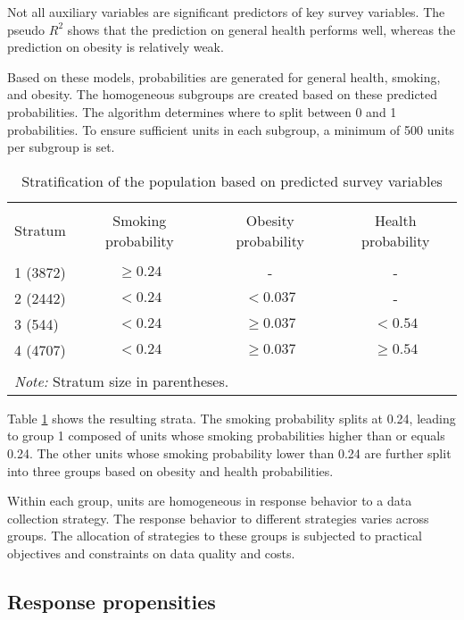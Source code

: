 \documentclass[11pt]{article}
\begin{document}
Not all auxiliary variables are significant predictors of key survey variables. The pseudo $R^2$ shows that the prediction on general health performs well, whereas the prediction on obesity is relatively weak.

Based on these models, probabilities are generated for general health, smoking, and obesity. The homogeneous subgroups are created based on these predicted probabilities. The algorithm determines where to split between 0 and 1 probabilities. To ensure sufficient units in each subgroup, a minimum of 500 units per subgroup is set.

\begin{table}[h]
    \centering
    \caption{Stratification of the population based on predicted survey variables}
    \begin{tabular}{lccc}
    \\ [-1.8ex] \hline
    \\[-1.8ex]
        Stratum & Smoking probability & Obesity probability & Health probability \\
        \hline \\[-1.8ex] 
        1 (3872) & $\geq 0.24$ & -            & - \\
        2 (2442) & $< 0.24$    & $< 0.037$    & - \\
        3 (544)  & $< 0.24$    & $\geq 0.037$ & $< 0.54$ \\
        4 (4707) & $< 0.24$    & $\geq 0.037$ & $\geq 0.54$ \\
        \hline \\[-1.8ex]
    \multicolumn{4}{l}{\textit{Note:} Stratum size in parentheses.}
    \end{tabular}
    \label{tbl:strata}
\end{table}

Table \ref{tbl:strata} shows the resulting strata. The smoking probability splits at 0.24, leading to group 1 composed of units whose smoking probabilities higher than or equals 0.24. The other units whose smoking probability lower than 0.24 are further split into three groups based on obesity and health probabilities.

Within each group, units are homogeneous in response behavior to a data collection strategy. The response behavior to different strategies varies across groups. The allocation of strategies to these groups is subjected to practical objectives and constraints on data quality and costs.

\subsection{Response propensities}
\label{sec:propensities}
\end{document}
